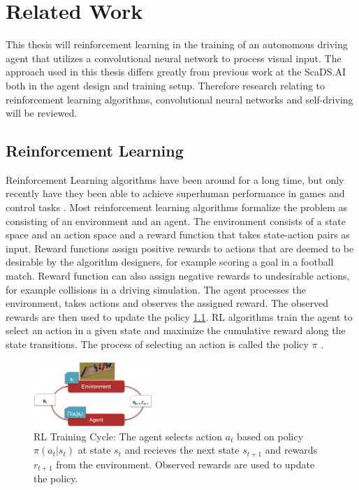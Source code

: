 \chapter{Related Work}
\label{cha:Related Work}

This thesis will reinforcement learning in the training of an autonomous driving agent that utilizes a convolutional neural network to process visual input. The approach used in this thesis differs greatly from previous work at the ScaDS.AI \autocite{maximilian} both in the agent design and training setup. Therefore research relating to reinforcement learning algorithms, convolutional neural networks and self-driving will be reviewed. 



\section{Reinforcement Learning}

Reinforcement Learning algorithms have been around for a long time, but only recently have they been able to achieve superhuman performance in games and control tasks \autocite{atari}. Most reinforcement learning algorithms formalize the problem as consisting of an environment and an agent. The environment consists of a state space and an action space and a reward function that takes state-action pairs as input. Reward functions assign positive rewards to actions that are deemed to be desirable by the algorithm designers, for example scoring a goal in a football match. Reward function can also assign negative rewards to undesirable actions, for example collisions in a driving simulation. The agent processes the environment, takes actions and observes the assigned reward. The observed rewards are then used to update the policy \ref{rlcycle}. RL algorithms train the agent to select an action in a given state and maximize the cumulative reward along the state transitions. The process of selecting an action is called the policy $\pi$ \autocite{rlbook2020}. 

\begin{figure}
    \centering
    \includegraphics[width=0.4\textwidth]{Bilder/rl_cycle.png}
    \caption{RL Training Cycle: The agent selects action $a_t$ based on policy $\pi(a_t|s_t)$ at state $s_t$ and recieves the next state $s_{t+1}$ and rewards $r_{t+1}$ from the environment. Observed rewards are used to update the policy.}
    \label{rlcycle}
\end{figure}

